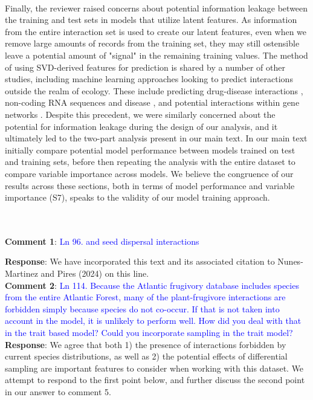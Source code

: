 \documentclass{article}
\begin{document}
\paragraph{}
Finally, the reviewer raised concerns about potential information leakage between the training and test sets in models that utilize latent features. As information from the entire interaction set is used to create our latent features, even when we remove large amounts of records from the training set, they may still ostensible leave a potential amount of "signal" in the remaining training values. The method of using SVD-derived features for prediction is shared by a number of other studies, including machine learning approaches looking to predict interactions outside the realm of ecology. These include predicting drug-disease interactions \cite{wu2019prediction}, non-coding RNA sequences and disease \cite{zeng2020sdlda}, and potential interactions within gene networks \cite{yeung2002reverse}. Despite this precedent, we were similarly concerned about the potential for information leakage during the design of our analysis, and it ultimately led to the two-part analysis present in our main text. In our main text initially compare potential model performance between models trained on test and training sets, before then repeating the analysis with the entire dataset to compare variable importance across models. We believe the congruence of our results across these sections, both in terms of model performance and variable importance (S7), speaks to the validity of our model training approach. 

\\
\\
    \textbf{Comment 1}: \textcolor{blue}{Ln 96. and seed dispersal interactions}

    \textbf{Response}: We have incorporated this text and its associated citation to Nunes-Martinez and Pires (2024) on this line. \\
    
    \textbf{Comment 2}: \textcolor{blue}{Ln 114. Because the Atlantic frugivory database includes species from the entire Atlantic Forest, many of the plant-frugivore interactions are forbidden simply because species do not co-occur. If that is not taken into account in the model, it is unlikely to perform well. How did you deal with that in the trait based model? Could you incorporate sampling in the trait model?}
    \\
    \textbf{Response}: We agree that both 1) the presence of interactions forbidden by current species distributions, as well as 2) the potential effects of differential sampling are important features to consider when working with this dataset. We attempt to respond to the first point below, and further discuss the second point in our answer to comment 5.
    
\end{document}
